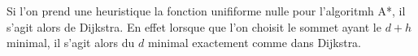 Si l'on prend une heuristique la fonction unififorme nulle pour l'algoritmh A*, il s'agit alors de Dijkstra. En effet lorsque que l'on choisit le sommet ayant le $d + h$ minimal, il s'agit alors du $d$ minimal exactement comme dans Dijkstra.
